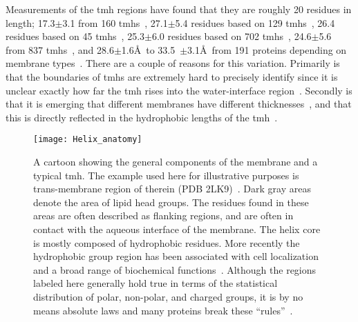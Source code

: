 Measurements of the \gls{tmh} regions have found that they are roughly 20 residues in length; 17.3$\pm$3.1 from 160 \gls{tmh}s~\cite{Hildebrand2004}, 27.1$\pm$5.4 residues based on 129 \gls{tmh}s~\cite{Ulmschneider2001}, 26.4 residues based on 45 \gls{tmh}s~\cite{Bowie1997}, 25.3$\pm$6.0 residues based on 702 \gls{tmh}s~\cite{Cuthbertson2005}, 24.6$\pm$5.6 from 837 \gls{tmh}s~\cite{Baeza-Delgado2013}, and 28.6$\pm$1.6\AA~to 33.5~$\pm$3.1\AA~from 191 proteins depending on membrane types~\cite{Pogozheva2013}. There are a couple of reasons for this variation. Primarily is that the boundaries of \gls{tmh}s are extremely hard to precisely identify since it is unclear exactly how far the \gls{tmh} rises into the water-interface region~\cite{VonHeijne2006}. Secondly is that it is emerging that different membranes have different thicknesses~\cite{VanMeer2008}, and that this is directly reflected in the hydrophobic lengths of the \gls{tmh}~\cite{Sharpe2010, Pogozheva2013}.
\begin{figure}[!ht]
\centering
\texttt{[image: Helix\_anatomy]}
\caption{A cartoon showing the general components of the membrane and a typical \gls{tmh}. The example used here for illustrative purposes is trans-membrane region of therein (PDB 2LK9)~\cite{Skasko2012}. Dark gray areas denote the area of lipid head groups. The residues found in these areas are often described as flanking regions, and are often in contact with the aqueous interface of the membrane. The helix core is mostly composed of hydrophobic residues. More recently the hydrophobic group region has been associated with cell localization and a broad range of biochemical functions~\cite{Junne2010, Wong2012}. Although the regions labeled here generally hold true in terms of the statistical distribution of polar, non-polar, and charged groups, it is by no means absolute laws and many proteins break these ``rules''~\cite{Sharpe2010, Baeza-Delgado2013, Pogozheva2013}. }
\label{fig:helixcartoon1}
\end{figure}




